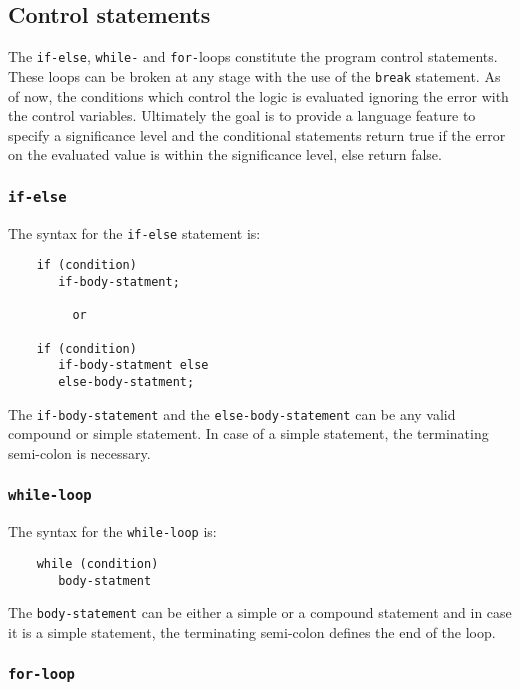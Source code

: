 \documentclass[11pt]{article}
\begin{document}
\subsection{Control statements}

The {\tt if-else}, {\tt while-} and {\tt for-}loops constitute the
program control statements.  These loops can be broken at any stage
with the use of the {\tt break} statement.  As of now, the conditions
which control the logic is evaluated ignoring the error with the
control variables.  Ultimately the goal is to provide a language
feature to specify a significance level and the conditional statements
return true if the error on the evaluated value is within the
significance level, else return false.

\subsubsection{{\tt if-else}}

The syntax for the {\tt if-else} statement is:
\begin{verbatim}
    if (condition)
       if-body-statment;

         or

    if (condition)
       if-body-statment else
       else-body-statment;
\end{verbatim}
The {\tt if-body-statement} and the {\tt else-body-statement} can be
any valid compound or simple statement.  In case of a simple
statement, the terminating semi-colon is necessary.

\subsubsection{{\tt while-loop}}

The syntax for the {\tt while-loop} is:
\begin{verbatim}
    while (condition)
       body-statment
\end{verbatim}
The {\tt body-statement} can be either a simple or a compound
statement and in case it is a simple statement, the terminating
semi-colon defines the end of the loop.

\subsubsection{{\tt for-loop}}
\end{document}
